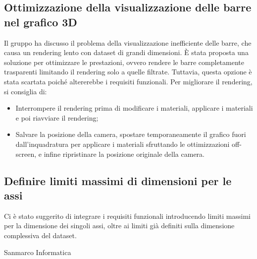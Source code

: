 \subsection{Ottimizzazione della visualizzazione delle barre nel grafico 3D}
Il gruppo ha discusso il problema della visualizzazione inefficiente delle barre, che causa un rendering lento con dataset di grandi dimensioni. È stata proposta una soluzione per ottimizzare le prestazioni, ovvero rendere le barre completamente trasparenti limitando il rendering solo a quelle filtrate. Tuttavia, questa opzione è stata scartata poiché altererebbe i requisiti funzionali.
Per migliorare il rendering, si consiglia di:
\begin{itemize}
\item Interrompere il rendering prima di modificare i materiali, applicare i materiali e poi riavviare il rendering;
\item Salvare la posizione della camera, spostare temporaneamente il grafico fuori dall'inquadratura per applicare i materiali sfruttando le ottimizzazioni off-screen, e infine ripristinare la posizione originale della camera.
\end{itemize}
\subsection{Definire limiti massimi di dimensioni per le assi}
Ci è stato suggerito di integrare i requisiti funzionali introducendo limiti massimi per la dimensione dei singoli assi, oltre ai limiti già definiti sulla dimensione complessiva del dataset.

\hfill\signature{Approvazione esterna}{Sanmarco Informatica}
